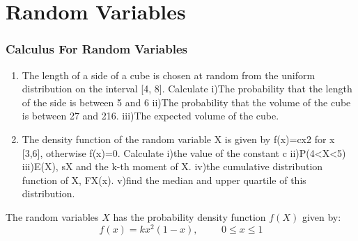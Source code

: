 	\chapter{Random Variables}

			\subsection{Calculus For Random Variables}
			
			\begin{enumerate}
				\item The length of a side of a cube is chosen at random from the uniform distribution on the interval [4, 8]. Calculate
				i)The probability that the length of the side is between 5 and 6
				ii)The probability that the volume of the cube is between 27 and 216.
				iii)The expected volume of the cube.
				
				\item The density function of the random variable X is given by f(x)=cx2 for x [3,6], otherwise f(x)=0. Calculate
				i)the value of the constant c
				ii)P(4<X<5)
				iii)E(X), sX and the k-th moment of X.
				iv)the cumulative distribution function of X, FX(x).
				v)find the median and upper quartile of this distribution.
				
			\end{enumerate}
			
			
			The random variables $X$ has the probability density function $f(X)$ given by:
			\[ f(x) = kx^2(1-x), \phantom{space} 0 \leq x \leq 1 \]
			
